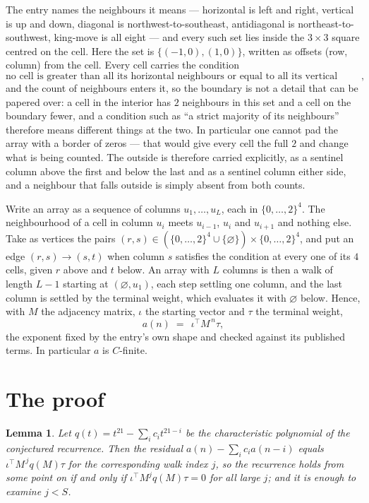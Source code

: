 \documentclass[11pt,a4paper]{article}
\theoremstyle{plain}
\newtheorem{lemma}[theorem]{Lemma}
\theoremstyle{definition}
\begin{document}
The entry names the neighbours it means --- horizontal is left and right, vertical is up and
down, diagonal is northwest-to-southeast, antidiagonal is northeast-to-southwest, king-move is
all eight --- and every such set lies inside the $3\times3$ square centred on the cell. Here
the set is $\{(-1,0), (1,0)\}$, written as offsets (row, column) from the cell. Every cell carries
the condition
\[
\text{no cell is greater than all its horizontal neighbours or equal to all its vertical neighbours},
\]
and the count of neighbours enters it, so the boundary is not a detail that can be papered
over: a cell in the interior has $2$ neighbours in this set and a cell on the boundary
fewer, and a condition such as ``a strict majority of its neighbours'' therefore means
different things at the two. In particular one cannot pad the array with a border of zeros ---
that would give every cell the full $2$ and change what is being counted. The outside is
therefore carried
explicitly, as a sentinel column above the first and below the last and as a sentinel column
either side, and a neighbour that falls outside is simply absent from both counts.

Write an array as a sequence of columns $u_1,\dots,u_L$, each in
$\{0,\dots,2\}^{4}$. The neighbourhood of a cell in column $u_i$ meets $u_{i-1}$,
$u_i$ and $u_{i+1}$ and nothing else. Take as vertices the pairs
$(r,s)\in(\{0,\dots,2\}^{4}\cup\{\varnothing\})\times\{0,\dots,2\}^{4}$,
and put an edge $(r,s)\to(s,t)$ when column $s$ satisfies the condition at every one of its
$4$ cells, given $r$ above and $t$ below. An array with $L$ columns is then a walk of length
$L-1$ starting at $(\varnothing,u_1)$, each step settling one column, and the last column is
settled by the terminal weight, which evaluates it with $\varnothing$ below. Hence,
with $M$ the adjacency matrix, $\iota$ the starting vector and $\tau$ the terminal weight,
\[
a(n)\;=\;\,\iota^{\!\top}M^{\,n}\tau ,
\]
the exponent fixed by the entry's own shape and checked against its published terms. In
particular $a$ is $C$-finite.

\section{The proof}

\begin{lemma}\label{lem:crit}
Let $q(t)=t^{21}-\sum_i c_it^{21-i}$ be the characteristic polynomial of the
conjectured recurrence. Then the residual $a(n)-\sum_ic_ia(n-i)$ equals
$\iota^{\!\top}M^{\,j}q(M)\tau$ for the corresponding walk index $j$, so the
recurrence holds from some point on if and only if $\iota^{\!\top}M^{j}q(M)\tau=0$ for all
large $j$; and it is enough to examine $j<S$.
\end{lemma}
\end{document}
